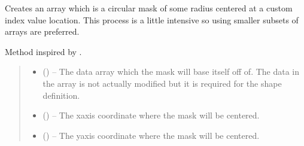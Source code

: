 \documentclass[letterpaper,11pt,english]{sphinxmanual}
\begin{document}
\begin{savenotes}\begin{fulllineitems}
\label{\detokenize{code/opihiexarata.library.image:opihiexarata.library.image.create_circular_mask}}
\pysigstartsignatures
{}
\pysigstopsignatures
\sphinxAtStartPar
Creates an array which is a circular mask of some radius centered at a
custom index value location. This process is a little intensive so using
smaller subsets of arrays are preferred.

\sphinxAtStartPar
Method inspired by .
\begin{quote}\begin{description}
\begin{itemize}
\item {} 
\sphinxAtStartPar
{} () – The data array which the mask will base itself off of. The data in the
array is not actually modified but it is required for the shape
definition.

\item {} 
\sphinxAtStartPar
{} () – The x\sphinxhyphen{}axis coordinate where the mask will be centered.

\item {} 
\sphinxAtStartPar
{} () – The y\sphinxhyphen{}axis coordinate where the mask will be centered.


\end{itemize}
\end{description}
\end{quote}
\end{fulllineitems}
\end{savenotes}
\end{document}
